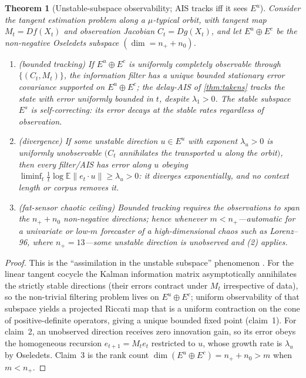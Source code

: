 \documentclass[10pt]{article}
\theoremstyle{plain}
\newtheorem{theorem}{Theorem}[section]
\theoremstyle{definition}
\theoremstyle{remark}
\newcommand{\E}{\mathbb{E}}
\newcommand{\srb}{\mu}
\newcommand{\Eu}{E^{u}}
\newcommand{\Ec}{E^{c}}
\newcommand{\Es}{E^{s}}
\begin{document}
\begin{theorem}[Unstable-subspace observability; AIS tracks iff it sees $\Eu$]
\label{thm:unstable}
Consider the tangent estimation problem along a $\srb$-typical orbit, with
tangent map $M_t=Df(X_t)$ and observation Jacobian $C_t=Dg(X_t)$, and let
$\Eu\oplus\Ec$ be the non-negative Oseledets subspace $(\dim=n_++n_0)$.
\begin{enumerate}[leftmargin=1.7em,itemsep=1pt]
\item \textup{(bounded tracking)} If $\Eu\oplus\Ec$ is uniformly completely
observable through $\{(C_t,M_t)\}$, the information filter has a unique bounded
stationary error covariance supported on $\Eu\oplus\Ec$; the delay-AIS of
\cref{thm:takens} tracks the state with error uniformly bounded in $t$, despite
$\lambda_1>0$. The stable subspace $\Es$ is self-correcting: its error decays at
the stable rates regardless of observation.
\item \textup{(divergence)} If some unstable direction $u\in\Eu$ with exponent
$\lambda_u>0$ is uniformly unobservable $(C_t$ annihilates the transported $u$
along the orbit$)$, then every filter/AIS has error along $u$ obeying
$\liminf_{t}\tfrac1t\log\E\|e_t\!\cdot\!u\|\ge\lambda_u>0$: it diverges
exponentially, and no context length or corpus removes it.
\item \textup{(fat-sensor chaotic ceiling)} Bounded tracking requires the
observations to span the $n_++n_0$ non-negative directions; hence whenever
$m<n_+$---automatic for a univariate or low-$m$ forecaster of a high-dimensional
chaos such as Lorenz--96, where $n_+=13$---some unstable direction is unobserved
and (2) applies.
\end{enumerate}
\end{theorem}
\begin{proof}
This is the ``assimilation in the unstable subspace'' phenomenon
\cite{trevisan2011,bocquet2017,gurumoorthy2017}. For the linear tangent cocycle
the Kalman information matrix asymptotically annihilates the strictly stable
directions (their errors contract under $M_t$ irrespective of data), so the
non-trivial filtering problem lives on $\Eu\oplus\Ec$; uniform observability of
that subspace yields a projected Riccati map that is a uniform contraction on the
cone of positive-definite operators, giving a unique bounded fixed point
(claim~1). For claim~2, an unobserved direction receives zero innovation gain, so
its error obeys the homogeneous recursion $e_{t+1}=M_te_t$ restricted to $u$,
whose growth rate is $\lambda_u$ by Oseledets. Claim~3 is the rank count
$\dim(\Eu\oplus\Ec)=n_++n_0>m$ when $m<n_+$.
\end{proof}
\end{document}
